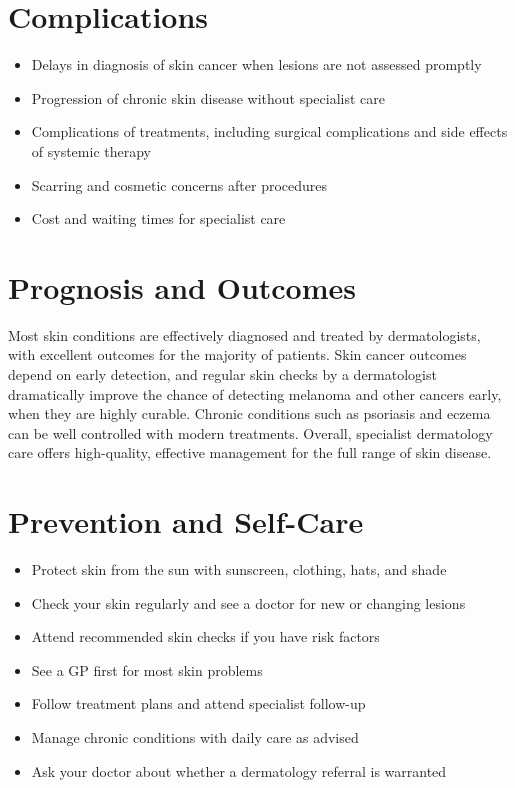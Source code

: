 \section*{Complications}
\begin{itemize}
    \item Delays in diagnosis of skin cancer when lesions are not assessed promptly
    \item Progression of chronic skin disease without specialist care
    \item Complications of treatments, including surgical complications and side effects of systemic therapy
    \item Scarring and cosmetic concerns after procedures
    \item Cost and waiting times for specialist care
\end{itemize}

\section*{Prognosis and Outcomes}
Most skin conditions are effectively diagnosed and treated by dermatologists, with excellent outcomes for the majority of patients. Skin cancer outcomes depend on early detection, and regular skin checks by a dermatologist dramatically improve the chance of detecting melanoma and other cancers early, when they are highly curable. Chronic conditions such as psoriasis and eczema can be well controlled with modern treatments. Overall, specialist dermatology care offers high-quality, effective management for the full range of skin disease.

\section*{Prevention and Self-Care}
\begin{itemize}
    \item Protect skin from the sun with sunscreen, clothing, hats, and shade
    \item Check your skin regularly and see a doctor for new or changing lesions
    \item Attend recommended skin checks if you have risk factors
    \item See a GP first for most skin problems
    \item Follow treatment plans and attend specialist follow-up
    \item Manage chronic conditions with daily care as advised
    \item Ask your doctor about whether a dermatology referral is warranted
\end{itemize}

